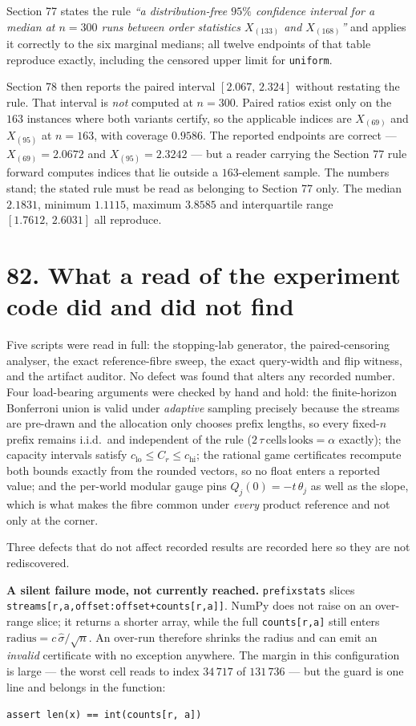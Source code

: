 \documentclass[9pt,twocolumn]{article}
\renewcommand{\_}{\CIGunderscore\allowbreak}
\begin{document}
Section 77 states the rule \emph{``a distribution-free $95\%$ confidence interval for a median at $n=300$ runs between order statistics $X_{(133)}$ and $X_{(168)}$''} and applies it correctly to the six marginal medians; all twelve endpoints of that table reproduce exactly, including the censored upper limit for \texttt{uniform}.

Section 78 then reports the paired interval $[2.067,\,2.324]$ without restating the rule. That interval is \emph{not} computed at $n=300$. Paired ratios exist only on the $163$ instances where both variants certify, so the applicable indices are $X_{(69)}$ and $X_{(95)}$ at $n=163$, with coverage $0.9586$. The reported endpoints are correct --- $X_{(69)} = 2.0672$ and $X_{(95)} = 2.3242$ --- but a reader carrying the Section 77 rule forward computes indices that lie outside a $163$-element sample. The numbers stand; the stated rule must be read as belonging to Section 77 only. The median $2.1831$, minimum $1.1115$, maximum $3.8585$ and interquartile range $[1.7612,\,2.6031]$ all reproduce.

\section*{82. What a read of the experiment code did and did not find}

Five scripts were read in full: the stopping-lab generator, the paired-censoring analyser, the exact reference-fibre sweep, the exact query-width and flip witness, and the artifact auditor. No defect was found that alters any recorded number. Four load-bearing arguments were checked by hand and hold: the finite-horizon Bonferroni union is valid under \emph{adaptive} sampling precisely because the streams are pre-drawn and the allocation only chooses prefix lengths, so every fixed-$n$ prefix remains i.i.d.\ and independent of the rule ($2\,\tau\,\text{cells}\,\text{looks} = \alpha$ exactly); the capacity intervals satisfy $c_{\mathrm{lo}} \le C_r \le c_{\mathrm{hi}}$; the rational game certificates recompute both bounds exactly from the rounded vectors, so no float enters a reported value; and the per-world modular gauge pins $Q_j(0) = -t\,\theta_j$ as well as the slope, which is what makes the fibre common under \emph{every} product reference and not only at the corner.

Three defects that do not affect recorded results are recorded here so they are not rediscovered.

\textbf{A silent failure mode, not currently reached.} \texttt{\_prefix\_stats} slices \texttt{streams[r,a,offset:offset+counts[r,a]]}. NumPy does not raise on an over-range slice; it returns a shorter array, while the full \texttt{counts[r,a]} still enters $\text{radius} = c\,\hat\sigma/\sqrt{n}$. An over-run therefore shrinks the radius and can emit an \emph{invalid} certificate with no exception anywhere. The margin in this configuration is large --- the worst cell reads to index $34\,717$ of $131\,736$ --- but the guard is one line and belongs in the function:
\begin{center}\footnotesize\texttt{assert len(x) == int(counts[r, a])}\end{center}
\end{document}
